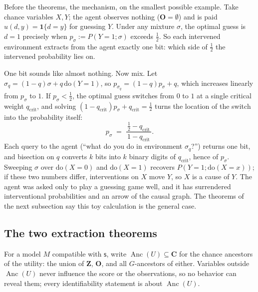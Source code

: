 \documentclass[11pt]{amsart}
\theoremstyle{plain}
\theoremstyle{definition}
\DeclareMathOperator{\Anc}{Anc}
\newcommand{\bC}{\mathbf{C}}
\newcommand{\bO}{\mathbf{O}}
\newcommand{\bZ}{\mathbf{Z}}
\newcommand{\sk}{\mathsf{s}}
\begin{document}
Before the theorems, the mechanism, on the smallest possible example. Take chance variables $X,Y$; the agent observes nothing ($\bO=\emptyset$) and is paid $u(d,y)=\mathbf{1}\{d=y\}$ for guessing $Y$. Under any mixture $\sigma$, the optimal guess is $d=1$ precisely when $p_\sigma:=P(Y\!=\!1;\sigma)$ exceeds $\tfrac12$. So each intervened environment extracts from the agent exactly one bit: which side of $\tfrac12$ the intervened probability lies on.

One bit sounds like almost nothing. Now mix. Let $\sigma_q=(1-q)\sigma+q\,\mathrm{do}(Y\!=\!1)$, so $p_{\sigma_q}=(1-q)p_\sigma+q$, which increases linearly from $p_\sigma$ to $1$. If $p_\sigma<\tfrac12$, the optimal guess switches from $0$ to $1$ at a single critical weight $q_{\mathrm{crit}}$, and solving $(1-q_{\mathrm{crit}})p_\sigma+q_{\mathrm{crit}}=\tfrac12$ turns the location of the switch into the probability itself:
\[
   p_\sigma \;=\; \frac{\tfrac12-q_{\mathrm{crit}}}{\,1-q_{\mathrm{crit}}\,}.
\]
Each query to the agent (``what do you do in environment $\sigma_q$?'') returns one bit, and bisection on $q$ converts $k$ bits into $k$ binary digits of $q_{\mathrm{crit}}$, hence of $p_\sigma$. Sweeping $\sigma$ over $\mathrm{do}(X\!=\!0)$ and $\mathrm{do}(X\!=\!1)$ recovers $P(Y\!=\!1;\mathrm{do}(X\!=\!x))$; if these two numbers differ, interventions on $X$ move $Y$, so $X$ is a cause of $Y$. The agent was asked only to play a guessing game well, and it has surrendered interventional probabilities and an arrow of the causal graph. The theorems of the next subsection say this toy calculation is the general case.

\subsection{The two extraction theorems}\label{subsec:theorems}

For a model $M$ compatible with $\sk$, write $\Anc(U)\subseteq\bC$ for the chance ancestors of the utility: the union of $\bZ$, $\bO$, and all $G$-ancestors of either. Variables outside $\Anc(U)$ never influence the score or the observations, so no behavior can reveal them; every identifiability statement is about $\Anc(U)$.
\end{document}
